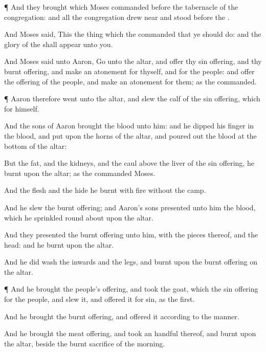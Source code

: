 {\par }{\PP {}¶ And they
brought
{} which
Moses
commanded
before the
tabernacle of the
congregation: and all the
congregation drew
near and
stood
before the
{}.

And
Moses
said, This
{} the
thing which the
{}
commanded that ye should
do: and the
glory of the
{} shall
appear unto you.

And
Moses
said unto
Aaron,
Go unto the
altar, and
offer thy sin
offering, and thy burnt
offering, and make an
atonement for thyself, and for the
people: and
offer the
offering of the
people, and make an
atonement for them; as the
{}
commanded.


\par }{\PP {}¶
Aaron therefore
went unto the
altar, and
slew the
calf of the sin
offering, which
{} for himself.

And the
sons of
Aaron
brought the
blood unto him: and he
dipped his
finger in the
blood, and
put
{} upon the
horns of the
altar, and
poured out the
blood at the
bottom of the
altar:

But the
fat, and the
kidneys, and the
caul
above the
liver of the sin
offering, he
burnt upon the
altar; as the
{}
commanded
Moses.

And the
flesh and the
hide he
burnt with
fire
without the
camp.

And he
slew the burnt
offering; and
Aaron’s
sons
presented unto him the
blood, which he
sprinkled round
about upon the
altar.

And they
presented the burnt
offering unto him, with the
pieces thereof, and the
head: and he
burnt
{} upon the
altar.

And he did
wash the
inwards and the
legs, and
burnt
{} upon the burnt
offering on the
altar.


\par }{\PP {}¶ And he
brought the
people’s
offering, and
took the
goat, which
{} the sin
offering for the
people, and
slew it, and offered it for
sin, as the
first.

And he
brought the burnt
offering, and
offered it according to the
manner.

And he
brought the meat
offering, and
took an
handful thereof, and
burnt
{} upon the
altar,
beside the burnt
sacrifice of the
morning.

}
